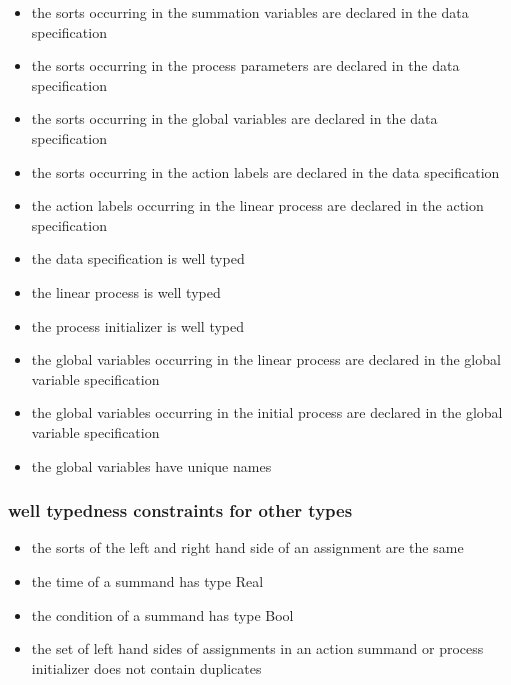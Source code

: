 \documentclass{article}
\begin{document}
\begin{itemize}
\item the sorts occurring in the summation variables are declared in the
data specification

\item the sorts occurring in the process parameters are declared in the data
specification

\item the sorts occurring in the global variables are declared in the data
specification

\item the sorts occurring in the action labels are declared in the data
specification

\item the action labels occurring in the linear process are declared in the
action specification

\item the data specification is well typed

\item the linear process is well typed

\item the process initializer is well typed

\item the global variables occurring in the linear process are declared in
the global variable specification

\item the global variables occurring in the initial process are declared in
the global variable specification

\item the global variables have unique names
\end{itemize}

\subsubsection{well typedness constraints for other types}

\begin{itemize}
\item the sorts of the left and right hand side of an assignment are the same

\item the time of a summand has type Real

\item the condition of a summand has type Bool

\item the set of left hand sides of assignments in an action summand or
process initializer does not contain duplicates
\end{itemize}
\end{document}

